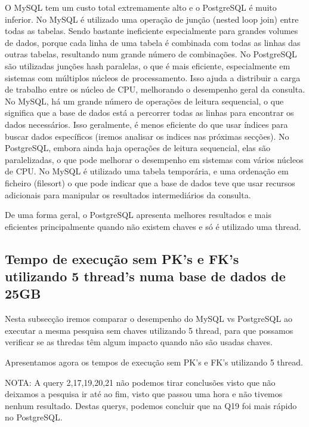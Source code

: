 \documentclass{article}
\begin{document}
O MySQL tem um custo total extremamente alto e o PostgreSQL é muito inferior.
No MySQL é utilizado uma operação de junção (nested loop join) entre todas as tabelas. Sendo bastante ineficiente especialmente para grandes volumes de dados, porque cada linha de uma tabela é combinada com todas as linhas das outras tabelas, resultando num grande número de combinações.
No PostgreSQL são utilizadas junções hash paralelas, o que é mais eficiente, especialmente em sistemas com múltiplos núcleos de processamento. Isso ajuda a distribuir a carga de trabalho entre os núcleo de CPU, melhorando o desempenho geral da consulta.
No MySQL, há um grande número de operações de leitura sequencial, o que significa que a base de dados está a percorrer todas as linhas para encontrar os dados necessários. Isso geralmente, é menos eficiente do que usar índices para buscar dados específicos (iremos analisar os indices nas próximas secções).
No PostgreSQL, embora ainda haja operações de leitura sequencial, elas são paralelizadas, o que pode melhorar o desempenho em sistemas com vários núcleos de CPU.
No MySQL é utilizado uma tabela temporária, e uma ordenação em ficheiro (filesort) o que pode indicar que a base de dados teve que usar recursos adicionais para manipular os resultados intermediários da consulta.

De uma forma geral, o PostgreSQL apresenta melhores resultados e mais eficientes principalmente quando não existem chaves e só é utilizado uma thread.

\clearpage
\subsection{Tempo de execução sem PK's e FK's utilizando 5 thread's numa base
de dados de 25GB}


\texttt{}\par Nesta subsecção iremos comparar o desempenho do MySQL vs PostgreSQL ao executar a mesma pesquisa sem chaves utilizando 5 thread, para que possamos verificar se as thredas têm algum impacto quando não são usadas chaves.

Apresentamos agora os tempos de execução sem PK's e FK's utilizando 5 thread.

NOTA: A query 2,17,19,20,21 não podemos tirar conclusões visto que não deixamos a pesquisa ir até ao fim, visto que passou uma hora e não tivemos nenhum resultado. Destas querys, podemos concluir que na Q19 foi mais rápido no PostgreSQL.
\end{document}

